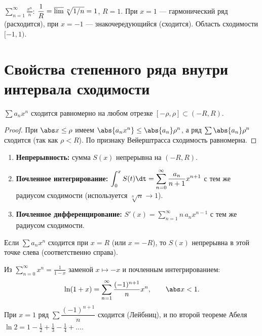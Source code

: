 \begin{example}
$\displaystyle\sum_{n=1}^\infty\frac{x^n}{n}$: $\dfrac1R=\varlimsup\sqrt[n]{1/n}=1$, $R=1$. При
$x=1$ — гармонический ряд (расходится), при $x=-1$ — знакочередующийся (сходится). Область
сходимости $[-1,1)$.
\end{example}

\section{Свойства степенного ряда внутри интервала сходимости}

\begin{theorem}
$\sum a_n x^n$ сходится равномерно на любом отрезке $[-\rho,\rho]\subset(-R,R)$.
\end{theorem}

\begin{proof}
При $\abs x\le\rho$ имеем $\abs{a_n x^n}\le\abs{a_n}\rho^n$, а ряд $\sum\abs{a_n}\rho^n$ сходится
(так как $\rho<R$). По признаку Вейерштрасса сходимость равномерна.
\end{proof}

\begin{corollary}\leavevmode
\begin{enumerate}[label=\arabic*),leftmargin=*]
  \item \textbf{Непрерывность:} сумма $S(x)$ непрерывна на $(-R,R)$.
  \item \textbf{Почленное интегрирование:}
        $\displaystyle\int_0^x S(t)\dt=\sum_{n=0}^\infty\frac{a_n}{n+1}x^{n+1}$ с тем же радиусом
        сходимости (используется $\sqrt[n]{n}\to1$).
  \item \textbf{Почленное дифференцирование:}
        $\displaystyle S'(x)=\sum_{n=1}^\infty n\,a_n x^{n-1}$ с тем же радиусом сходимости.
\end{enumerate}
\end{corollary}

\begin{theorem}
Если $\sum a_n x^n$ сходится при $x=R$ (или $x=-R$), то $S(x)$ непрерывна в этой точке слева
(соответственно справа).
\end{theorem}

\begin{example}[вывод $\ln2$]
Из $\displaystyle\sum_{n=0}^\infty x^n=\frac1{1-x}$ заменой $x\mapsto-x$ и почленным
интегрированием:
\[
  \ln(1+x)=\sum_{n=1}^\infty\frac{(-1)^{n+1}}{n}x^n,\qquad \abs x<1 .
\]
При $x=1$ ряд $\sum\dfrac{(-1)^{n+1}}{n}$ сходится (Лейбниц), и по второй теореме Абеля
$\ln2=1-\tfrac12+\tfrac13-\tfrac14+\dots$.
\end{example}

